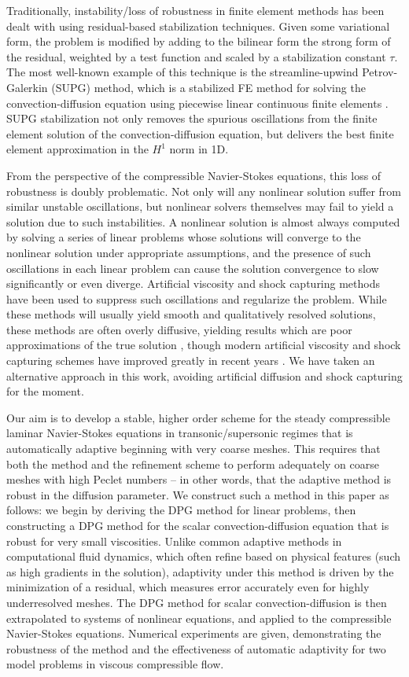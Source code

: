 Traditionally, instability/loss of robustness in finite element methods has been dealt with using residual-based stabilization techniques.  Given some variational form, the problem is modified by adding to the bilinear form the strong form of the residual, weighted by a test function and scaled by a stabilization constant $\tau$.  The most well-known example of this technique is the streamline-upwind Petrov-Galerkin (SUPG) method, which is a stabilized FE method for solving the convection-diffusion equation using piecewise linear continuous finite elements \cite{SUPG}.  SUPG stabilization not only removes the spurious oscillations from the finite element solution of the convection-diffusion equation, but delivers the best finite element approximation in the $H^1$ norm in 1D.  

From the perspective of the compressible Navier-Stokes equations, this loss of robustness is doubly problematic.  Not only will any nonlinear solution suffer from similar unstable oscillations, but nonlinear solvers themselves may fail to yield a solution due to such instabilities.  A nonlinear solution is almost always computed by solving a series of linear problems whose solutions will converge to the nonlinear solution under appropriate assumptions, and the presence of such oscillations in each linear problem can cause the solution convergence to slow significantly or even diverge.  Artificial viscosity and shock capturing methods have been used to suppress such oscillations and regularize the problem.  While these methods will usually yield smooth and qualitatively resolved solutions, these methods are often overly diffusive, yielding results which are poor approximations of the true solution \cite{Gresho1981223}, though modern artificial viscosity and shock capturing schemes have improved greatly in recent years \cite{Barter,Guermond20114248}.  We have taken an alternative approach in this work, avoiding artificial diffusion and shock capturing for the moment.  

Our aim is to develop a stable, higher order scheme for the steady compressible laminar Navier-Stokes equations in transonic/supersonic regimes that is automatically adaptive beginning with very coarse meshes.  This requires that both the method and the refinement scheme to perform adequately on coarse meshes with high Peclet numbers -- in other words, that the adaptive method is robust in the diffusion parameter.  We construct such a method in this paper as follows: we begin by deriving the DPG method for linear problems, then constructing a DPG method for the scalar convection-diffusion equation that is robust for very small viscosities.  Unlike common adaptive methods in computational fluid dynamics, which often refine based on physical features (such as high gradients in the solution), adaptivity under this method is driven by the minimization of a residual, which measures error accurately even for highly underresolved meshes.  The DPG method for scalar convection-diffusion is then extrapolated to systems of nonlinear equations, and applied to the compressible Navier-Stokes equations.  Numerical experiments are given, demonstrating the robustness of the method and the effectiveness of automatic adaptivity for two model problems in viscous compressible flow. 
